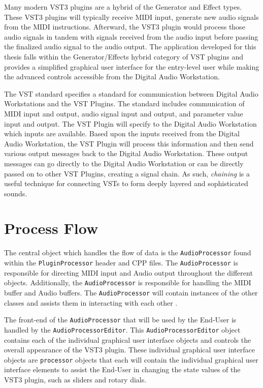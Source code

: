 \documentclass[a4paper,12pt]{report}
\begin{document}
Many modern VST3 plugins are a hybrid of the Generator and Effect types. These VST3 plugins will typically receive MIDI input, generate new audio signals from the MIDI instructions. Afterward, the VST3 plugin would process those audio signals in tandem with signals received from the audio input before passing the finalized audio signal to the audio output. The application developed for this thesis falls within the Generator/Effects hybrid category of VST plugins and provides a simplified graphical user interface for the entry-level user while making the advanced controls accessible from the Digital Audio Workstation.

The VST standard specifies a standard for communication between Digital Audio Workstations and the VST Plugins. The standard includes communication of MIDI input and output, audio signal input and output, and parameter value input and output. The VST Plugin will specify to the Digital Audio Workstation which inputs are available. Based upon the inputs received from the Digital Audio Workstation, the VST Plugin will process this information and then send various output messages back to the Digital Audio Workstation. These output messages can go directly to the Digital Audio Workstation or can be directly passed on to other VST Plugins, creating a signal chain. As such, \emph{chaining} is a useful technique for connecting VSTs to form deeply layered and sophisticated sounds.

\section{Process Flow}
\label{sec:processflow}
The central object which handles the flow of data is the \texttt{Audio\-Processor} found within the \texttt{Plugin\-Processor} header and CPP files. The \texttt{Audio\-Processor} is responsible for directing MIDI input and Audio output throughout the different objects. Additionally, the \texttt{Audio\-Processor} is responsible for handling the MIDI buffer and Audio buffers. The \texttt{Audio\-Processor} will contain instances of the other classes and assists them in interacting with each other \cite{juceclassindex}.

The front-end of the \texttt{Audio\-Processor} that will be used by the End-User is handled by the \texttt{Audio\-Processor\-Editor}. This \texttt{Audio\-Processor\-Editor} object contains each of the individual graphical user interface objects and controls the overall appearance of the VST3 plugin. These individual graphical user interface objects are \texttt{processor} objects that each will contain the individual graphical user interface elements to assist the End-User in changing the state values of the VST3 plugin, such as sliders and rotary dials.
\end{document}
